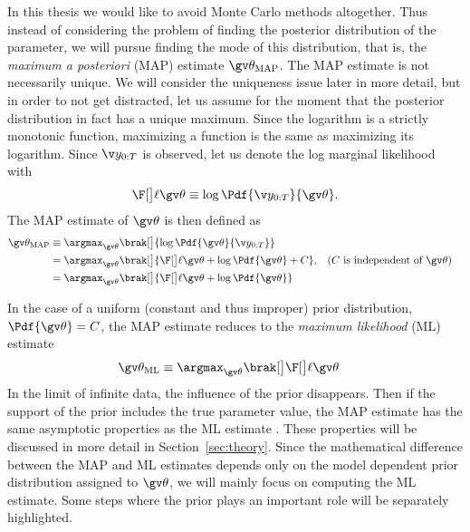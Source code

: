 In this thesis we would like to avoid Monte Carlo methods altogether. Thus instead
of considering the problem of finding the posterior distribution of the parameter,
we will pursue finding the mode of this distribution, that is, the \emph{maximum a posteriori} (MAP) estimate
$\Th_{\text{MAP}}$. The MAP estimate is not necessarily unique. 
We will consider the uniqueness issue later in more detail, but in order
to not get distracted, let us assume for the moment that the posterior distribution in fact
has a unique maximum. Since the logarithm is a strictly monotonic function, maximizing a function
is the same as maximizing its logarithm. 
Since $\Y$ is observed, let us denote 
the log marginal likelihood with 
\begin{align*}
	\lLH \equiv \log \Pdf{\Y}{\Th}.
\end{align*}
The MAP estimate of $\Th$ is then defined as 
\begin{align}
	\Th_{\text{MAP}} &\equiv \argmax_{\Th}\brak[\big]{ \log\Pdf{\Th}{\Y}} \nonumber\\ 
	&=\argmax_{\Th}\brak[\big]{\lLH + \log\Pdf{\Th}+C}, && \text{($C$ is independent of $\Th$)} \nonumber\\
	&=\argmax_{\Th}\brak[\big]{\lLH + \log\Pdf{\Th}}\\
	\label{eq:MAP}
\end{align}

In the case of a uniform (constant and thus improper)
prior distribution, $\Pdf{\Th}=C$, the MAP estimate reduces to the
\emph{maximum likelihood} (ML) estimate
\begin{align}
	\Th_{\text{ML}} &\equiv \argmax_{\Th}\brak[\big]\lLH\label{eq:ML}
\end{align}
In the limit of infinite data, the influence of the prior
disappears. Then if the support of the prior includes the true
parameter value, the MAP estimate has the same asymptotic properties
as the ML estimate \parencite{Cappe2005}. These properties will be discussed in more
detail in Section~\ref{sec:theory}. Since the mathematical difference
between the MAP and ML estimates depends only on the model dependent prior distribution
assigned to $\Th$, we will mainly focus on computing the ML estimate.
Some steps where the prior plays an important role will be separately
highlighted. 

